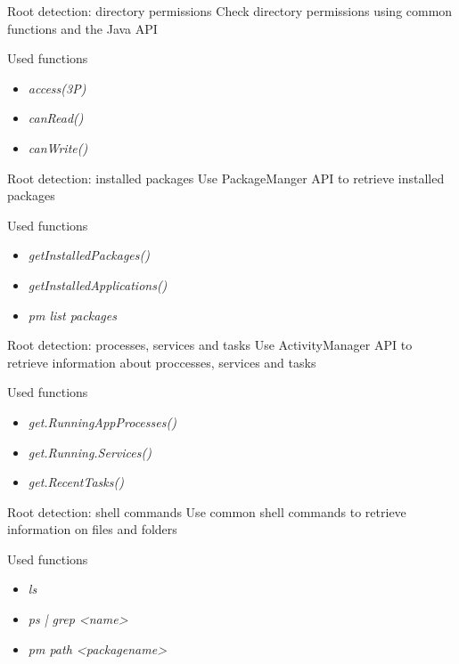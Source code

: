 \documentclass[
    11pt,%
    aspectratio=169,%
]{beamer}
\begin{document}
\begin{frame}{Root detection: directory permissions}
Check directory permissions using common functions and the Java API
\begin{exampleblock}{Used functions}
\begin{itemize}
  \item \emph{access(3P)}
  \item \emph{canRead()}
  \item \emph{canWrite()}
\end{itemize}
\end{exampleblock}
\end{frame}


\begin{frame}{Root detection: installed packages}
Use \alert{PackageManger} API to retrieve installed packages
\begin{exampleblock}{Used functions}
\begin{itemize}
  \item \emph{getInstalledPackages()}
  \item \emph{getInstalledApplications()}
  \item \emph{pm list packages}
\end{itemize}
\end{exampleblock}
\end{frame}



\begin{frame}{Root detection: processes, services and tasks}
Use \alert{ActivityManager} API to retrieve information about proccesses, services and tasks
\begin{exampleblock}{Used functions}
\begin{itemize}
  \item \emph{get.RunningAppProcesses()}
  \item \emph{get.Running.Services()}
  \item \emph{get.RecentTasks()}
\end{itemize}
\end{exampleblock}
\end{frame}




\begin{frame}{Root detection: shell commands}
Use common shell commands to retrieve information on files and folders
\begin{exampleblock}{Used functions}
\begin{itemize}
  \item \emph{ls}
  \item \emph{ps | grep <name>}
  \item \emph{pm path <packagename>}
\end{itemize}
\end{exampleblock}
\end{frame}
\end{document}
